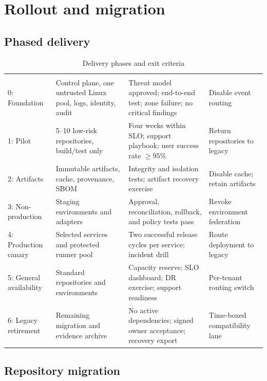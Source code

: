 \section{Rollout and migration}

\subsection{Phased delivery}

\begin{longtable}{@{}L{0.13\textwidth}L{0.28\textwidth}L{0.35\textwidth}L{0.16\textwidth}@{}}
\caption{Delivery phases and exit criteria}\label{tab:rollout}\\
\toprule
{} &  &  &  \\
\midrule
\endfirsthead
\toprule
{} &  &  &  \\
\midrule
{}: Foundation & Control plane, one untrusted Linux pool, logs, identity, audit & Threat model approved; end-to-end test; zone failure; no critical findings & Disable event routing \\
1: Pilot & 5--10 low-risk repositories, build/test only & Four weeks within SLO; support playbook; user success rate $\geq95\%$ & Return repositories to legacy \\
2: Artifacts & Immutable artifacts, cache, provenance, SBOM & Integrity and isolation tests; artifact recovery exercise & Disable cache; retain artifacts \\
3: Non-production & Staging environments and adapters & Approval, reconciliation, rollback, and policy tests pass & Revoke environment federation \\
4: Production canary & Selected services and protected runner pool & Two successful release cycles per service; incident drill & Route deployment to legacy \\
5: General availability & Standard repositories and environments & Capacity reserve; SLO dashboard; DR exercise; support readiness & Per-tenant routing switch \\
6: Legacy retirement & Remaining migration and evidence archive & No active dependencies; signed owner acceptance; recovery export & Time-boxed compatibility lane \\
\bottomrule
\end{longtable}

\subsection{Repository migration}

